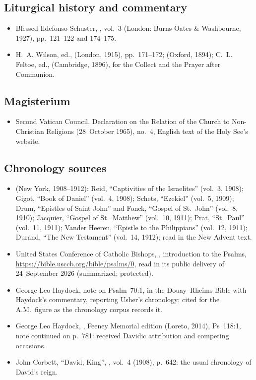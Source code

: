 {\subsection*{Liturgical history and commentary}
\begin{itemize}[itemsep=0pt,topsep=.25em]
\item Blessed Ildefonso Schuster, , vol.~3 (London: Burns Oates \& Washbourne, 1927), pp.~121--122 and 174--175.
\item H.~A. Wilson, ed.,  (London, 1915), pp.~171--172;  (Oxford, 1894); C.~L. Feltoe, ed.,  (Cambridge, 1896), for the Collect and the Prayer after Communion.
\end{itemize}

\subsection*{Magisterium}
\begin{itemize}[itemsep=0pt,topsep=.25em]
\item Second Vatican Council, Declaration on the Relation of the Church to Non-Christian Religions  (28~October 1965), no.~4, English text of the Holy See's website.
\end{itemize}

\subsection*{Chronology sources}
\begin{itemize}[itemsep=0pt,topsep=.25em]
\item {} (New York, 1908--1912): Reid, ``Captivities of the Israelites'' (vol.~3, 1908); Gigot, ``Book of Daniel'' (vol.~4, 1908); Schets, ``Ezekiel'' (vol.~5, 1909); Drum, ``Epistles of Saint John'' and Fonck, ``Gospel of St.~John'' (vol.~8, 1910); Jacquier, ``Gospel of St.~Matthew'' (vol.~10, 1911); Prat, ``St.~Paul'' (vol.~11, 1911); Vander Heeren, ``Epistle to the Philippians'' (vol.~12, 1911); Durand, ``The New Testament'' (vol.~14, 1912); read in the New Advent text.
\item United States Conference of Catholic Bishops, , introduction to the Psalms, \url{https://bible.usccb.org/bible/psalms/0}, read in its public delivery of 24~September 2026 (summarized; protected).
\item George Leo Haydock, note on Psalm~70:1, in the Douay--Rheims Bible with Haydock's commentary, reporting Usher's chronology; cited for the A.M.\ figure as the chronology corpus records it.
\item George Leo Haydock, , Feeney Memorial edition (Loreto, 2014), Ps~118:1, note continued on p.~781: received Davidic attribution and competing occasions.
\item John Corbett, ``David, King'', , vol.~4 (1908), p.~642: the usual chronology of David's reign.
\end{itemize}
\par}
